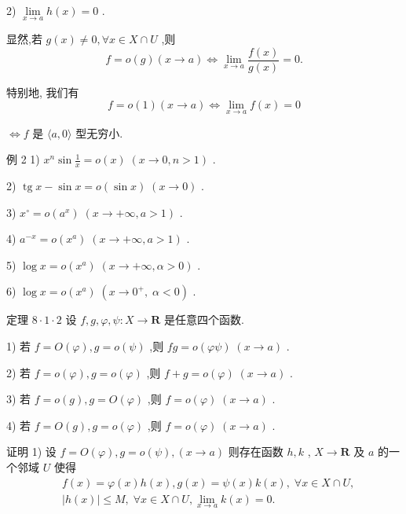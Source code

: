 2) $\mathop{\lim }\limits_{{x \rightarrow  a}}h\left( x\right)  = 0$ .

显然,若 $g\left( x\right)  \neq  0,\forall x \in  X \cap  U$ ,则
$$f = o\left( g\right) \left( {x \rightarrow  a}\right)  \Leftrightarrow  \mathop{\lim }\limits_{{x \rightarrow  a}}\frac{f\left( x\right) }{g\left( x\right) } = 0.$$

特别地, 我们有
$$f = o\left( 1\right) \left( {x \rightarrow  a}\right)  \Leftrightarrow  \mathop{\lim }\limits_{{x \rightarrow  a}}f\left( x\right)  = 0$$

$\Leftrightarrow  f$ 是 $\langle a,0\rangle$ 型无穷小.

例 2 1) ${x}^{n}\sin \frac{1}{x} = o\left( x\right) \;\left( {x \rightarrow  0,n > 1}\right)$ .

2) $\operatorname{tg}x - \sin x = o\left( {\sin x}\right) \;\left( {x \rightarrow  0}\right)$ .

3) ${x}^{ \circ  } = o\left( {a}^{x}\right) \;\left( {x \rightarrow   + \infty ,a > 1}\right)$ .

4) ${a}^{-x} = o\left( {x}^{a}\right) \;\left( {x \rightarrow   + \infty ,a > 1}\right)$ .

5) $\log x = o\left( {x}^{a}\right) \;\left( {x \rightarrow   + \infty ,\alpha  > 0}\right)$ .

6) $\log x = o\left( {x}^{a}\right) \;\left( {x \rightarrow  {0}^{ + },\;\alpha  < 0}\right)$ .

定理 $8 \cdot  1 \cdot  2$ 设 $f,g,\varphi ,\psi  : X \rightarrow  \mathbf{R}$ 是任意四个函数.

1) 若 $f = O\left( \varphi \right) ,g = o\left( \psi \right)$ ,则 ${fg} = o\left( {\varphi \psi }\right) \;\left( {x \rightarrow  a}\right)$ .

2) 若 $f = o\left( \varphi \right) ,g = o\left( \varphi \right)$ ,则 $f + g = o\left( \varphi \right) \;\left( {x \rightarrow  a}\right)$ .

3) 若 $f = o\left( g\right) ,g = O\left( \varphi \right)$ ,则 $f = o\left( \varphi \right) \;\left( {x \rightarrow  a}\right)$ .

4) 若 $f = O\left( g\right) ,g = o\left( \varphi \right)$ ,则 $f = o\left( \varphi \right) \;\left( {x \rightarrow  a}\right)$ .

证明 1) 设 $f = O\left( \varphi \right) ,g = o\left( \psi \right) ,\left( {x \rightarrow  a}\right)$ 则存在函数 $h,k$ , $X \rightarrow  \mathbf{R}$ 及 $a$ 的一个邻域 $U$ 使得
\begin{align*}
	&f\left( x\right)  = \varphi \left( x\right) h\left( x\right) ,g\left( x\right)  = \psi \left( x\right) k\left( x\right) ,\;\forall x \in  X \cap  U,\\
	&\left| {h\left( x\right) }\right|  \leq  M,\;\forall x \in  X \cap  U,\mathop{\lim }\limits_{{x \rightarrow  a}}k\left( x\right)  = 0.
\end{align*}

